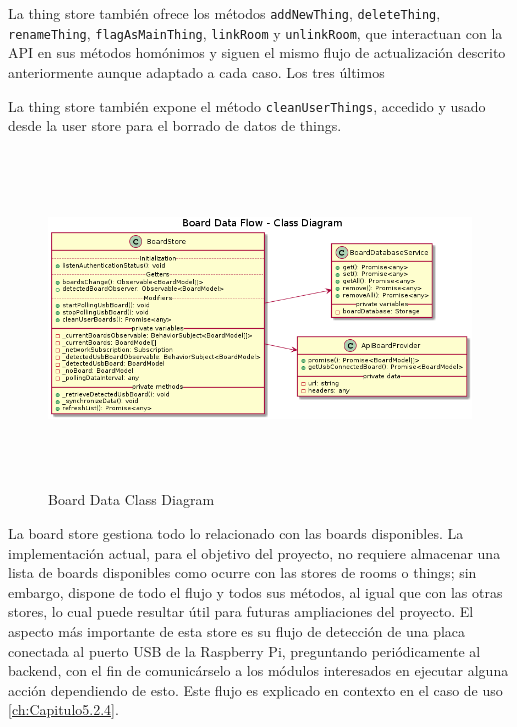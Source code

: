 \vspace{1cm}

La thing store también ofrece los métodos \verb|addNewThing|, \verb|deleteThing|, \verb|renameThing|, \verb|flagAsMainThing|, \verb|linkRoom| y \verb|unlinkRoom|, que interactuan con la API en sus métodos homónimos y siguen el mismo flujo de actualización descrito anteriormente aunque adaptado a cada caso. Los tres últimos 

La thing store también expone el método \verb|cleanUserThings|, accedido y usado desde la user store para el borrado de datos de things.


\begin{figure}[hbt!]
\centering
\includegraphics[height=3.5in]{figures/diagrams/front/data-flow/board.png}
\caption[thing]{Board Data Class Diagram\footnotemark}
\end{figure}

La board store gestiona todo lo relacionado con las boards disponibles. La implementación actual, para el objetivo del proyecto, no requiere almacenar una lista de boards disponibles como ocurre con las stores de rooms o things; sin embargo, dispone de todo el flujo y todos sus métodos, al igual que con las otras stores, lo cual puede resultar útil para futuras ampliaciones del proyecto. El aspecto más importante de esta store es su flujo de detección de una placa conectada al puerto USB de la Raspberry Pi, preguntando periódicamente al backend, con el fin de comunicárselo a los módulos interesados en ejecutar alguna acción dependiendo de esto. Este flujo es explicado en contexto en el caso de uso \ref{ch:Capitulo5.2.4}.

